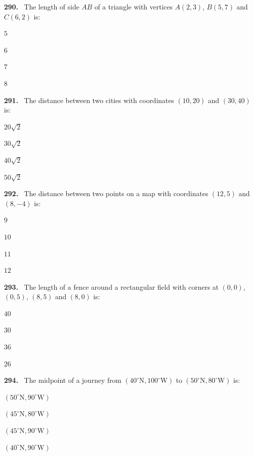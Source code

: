 \documentclass[11pt]{article}
\newenvironment{qenv}[1]{%
  \par\medskip\noindent\textbf{#1.}\ \ignorespaces
}{\par}
\begin{document}
\begin{qenv}{290} The length of side $AB$ of a triangle with vertices $A(2,3)$, $B(5,7)$ and $C(6,2)$ is:
\begin{options} \item $5$ \item $6$ \item $7$ \item $8$ \end{options} \end{qenv}

\begin{qenv}{291} The distance between two cities with coordinates $(10,20)$ and $(30,40)$ is:
\begin{options} \item $20\sqrt{2}$ \item $30\sqrt{2}$ \item $40\sqrt{2}$ \item $50\sqrt{2}$ \end{options} \end{qenv}

\begin{qenv}{292} The distance between two points on a map with coordinates $(12,5)$ and $(8,-4)$ is:
\begin{options} \item $9$ \item $10$ \item $11$ \item $12$ \end{options} \end{qenv}

\begin{qenv}{293} The length of a fence around a rectangular field with corners at $(0,0)$, $(0,5)$, $(8,5)$ and $(8,0)$ is:
\begin{options} \item $40$ \item $30$ \item $36$ \item $26$ \end{options} \end{qenv}

\begin{qenv}{294} The midpoint of a journey from $(40^{\circ}\text{N}, 100^{\circ}\text{W})$ to $(50^{\circ}\text{N}, 80^{\circ}\text{W})$ is:
\begin{options} \item $(50^{\circ}\text{N}, 90^{\circ}\text{W})$ \item $(45^{\circ}\text{N}, 80^{\circ}\text{W})$ \item $(45^{\circ}\text{N}, 90^{\circ}\text{W})$ \item $(40^{\circ}\text{N}, 90^{\circ}\text{W})$ \end{options} \end{qenv}
\end{document}
